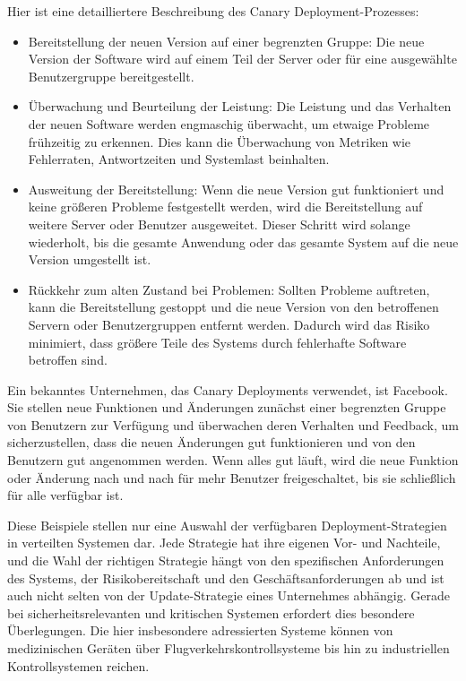 \begin{itemize}
Hier ist eine detailliertere Beschreibung des Canary Deployment-Prozesses:
\begin{itemize} 
\item Bereitstellung der neuen Version auf einer begrenzten Gruppe: Die neue Version der Software wird auf einem Teil der Server oder für eine ausgewählte Benutzergruppe bereitgestellt.
\item Überwachung und Beurteilung der Leistung: Die Leistung und das Verhalten der neuen Software werden engmaschig überwacht, um etwaige Probleme frühzeitig zu erkennen. Dies kann die Überwachung von Metriken wie Fehlerraten, Antwortzeiten und Systemlast beinhalten.
\item Ausweitung der Bereitstellung: Wenn die neue Version gut funktioniert und keine größeren Probleme festgestellt werden, wird die Bereitstellung auf weitere Server oder Benutzer ausgeweitet. Dieser Schritt wird solange wiederholt, bis die gesamte Anwendung oder das gesamte System auf die neue Version umgestellt ist.
\item Rückkehr zum alten Zustand bei Problemen: Sollten Probleme auftreten, kann die Bereitstellung gestoppt und die neue Version von den betroffenen Servern oder Benutzergruppen entfernt werden. Dadurch wird das Risiko minimiert, dass größere Teile des Systems durch fehlerhafte Software betroffen sind.
\end{itemize} 
Ein bekanntes Unternehmen, das Canary Deployments verwendet, ist Facebook. Sie stellen neue Funktionen und Änderungen zunächst einer begrenzten Gruppe von Benutzern zur Verfügung und überwachen deren Verhalten und Feedback, um sicherzustellen, dass die neuen Änderungen gut funktionieren und von den Benutzern gut angenommen werden. Wenn alles gut läuft, wird die neue Funktion oder Änderung nach und nach für mehr Benutzer freigeschaltet, bis sie schließlich für alle verfügbar ist.
\end{itemize} 
Diese Beispiele stellen nur eine Auswahl der verfügbaren Deployment-Strategien in verteilten Systemen dar. Jede Strategie hat ihre eigenen Vor- und Nachteile, und die Wahl der richtigen Strategie hängt von den spezifischen Anforderungen des Systems, der Risikobereitschaft und den Geschäftsanforderungen ab und ist auch nicht selten von der Update-Strategie eines Unternehmes abhängig. Gerade bei sicherheitsrelevanten und kritischen Systemen erfordert dies besondere Überlegungen. 
Die hier insbesondere adressierten Systeme können von medizinischen Geräten über Flugverkehrskontrollsysteme bis hin zu industriellen Kontrollsystemen reichen. 

